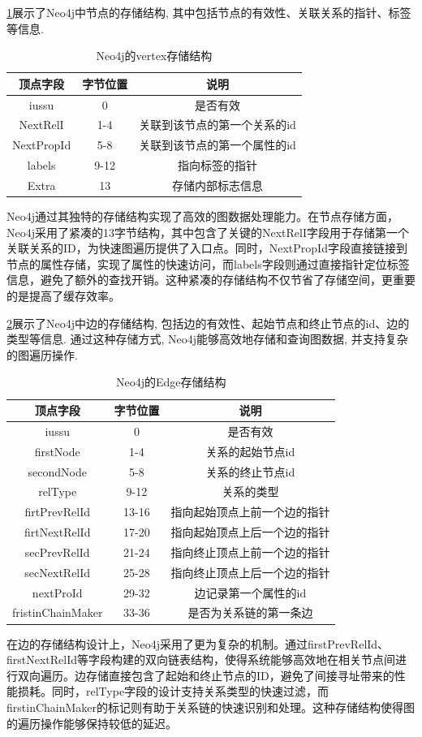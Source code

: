 \cref{tab:neo4j-vertex}展示了Neo4j中节点的存储结构, 其中包括节点的有效性、关联关系的指针、标签等信息.
\begin{table}[H]
	\centering
	\caption{Neo4j的vertex存储结构}
	\begin{tabular}{|c|c|c|}
		\hline
		顶点字段       & 字节位置 & 说明              \\
		\hline
		iussu      & 0    & 是否有效            \\
		NextRelI   & 1-4  & 关联到该节点的第一个关系的id \\
		NextPropId & 5-8  & 关联到该节点的第一个属性的id \\
		labels     & 9-12 & 指向标签的指针         \\
		Extra      & 13   & 存储内部标志信息        \\
		\hline
	\end{tabular}
	\label{tab:neo4j-vertex}
\end{table}
Neo4j通过其独特的存储结构实现了高效的图数据处理能力。在节点存储方面，Neo4j采用了紧凑的13字节结构，其中包含了关键的NextRelI字段用于存储第一个关联关系的ID，为快速图遍历提供了入口点。同时，NextPropId字段直接链接到节点的属性存储，实现了属性的快速访问，而labels字段则通过直接指针定位标签信息，避免了额外的查找开销。这种紧凑的存储结构不仅节省了存储空间，更重要的是提高了缓存效率。


\cref{tab:neo4j-edge}展示了Neo4j中边的存储结构, 包括边的有效性、起始节点和终止节点的id、边的类型等信息. 通过这种存储方式, Neo4j能够高效地存储和查询图数据, 并支持复杂的图遍历操作.
\begin{table}[H]
	\centering
	\caption{Neo4j的Edge存储结构}
	\begin{tabular}{|c|c|c|}
		\hline
		顶点字段              & 字节位置  & 说明             \\
		\hline
		iussu             & 0     & 是否有效           \\
		firstNode         & 1-4   & 关系的起始节点id      \\
		secondNode        & 5-8   & 关系的终止节点id      \\
		relType           & 9-12  & 关系的类型          \\
		firtPrevRelId     & 13-16 & 指向起始顶点上前一个边的指针 \\
		firtNextRelId     & 17-20 & 指向起始顶点上后一个边的指针 \\
		secPrevRelId      & 21-24 & 指向终止顶点上前一个边的指针 \\
		secNextRelId      & 25-28 & 指向终止顶点上后一个边的指针 \\
		nextProId         & 29-32 & 边记录第一个属性的id    \\
		fristinChainMaker & 33-36 & 是否为关系链的第一条边    \\
		\hline
	\end{tabular}
	\label{tab:neo4j-edge}
\end{table}
在边的存储结构设计上，Neo4j采用了更为复杂的机制。通过firstPrevRelId、firstNextRelId等字段构建的双向链表结构，使得系统能够高效地在相关节点间进行双向遍历。边存储直接包含了起始和终止节点的ID，避免了间接寻址带来的性能损耗。同时，relType字段的设计支持关系类型的快速过滤，而firstinChainMaker的标记则有助于关系链的快速识别和处理。这种存储结构使得图的遍历操作能够保持较低的延迟。

